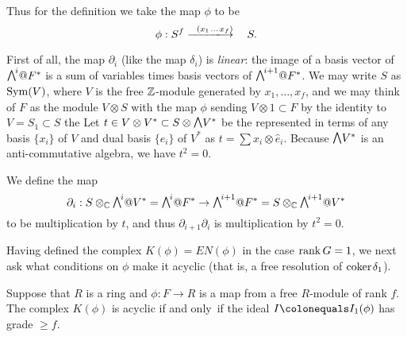 Thus for the definition we take the map $\phi$ to be
$$
\phi: S^{f}\ruuuto {\ \
(x_{1} \,\dots \, x_{f})
} \hskip0.7em S.
$$

First of all, the map $\partial_{i}$ (like the map $\delta_{i}$) is
\emph{linear}: the image of a basis vector of $\mwedge^{i}@F^{*} $ is a
sum of variables times basis vectors
of $\mwedge^{i+1}@F^{*}$. We may write $S$ as $\operatorname{Sym}(V)$, where $V$ is the
free ${\mathbb Z}$-module generated by $x_{1}, \dots, x_{f}$, and we may think
of $F$ as the module $V\otimes S$ with the map
$\phi$ sending $V\otimes 1\subset F$ by the identity to $V = S_{1}\subset S$
\emdash the 
%
Let $t\in V\otimes V^{*}\subset S\otimes \mwedge \,V^{*}$ be the 
\index{trace}%
represented in terms of any basis $\{x_{i}\}$ of $V$
and dual basis $\{\hat e_{i}\}$ of $V^{*}$ as $t = \sum x_{i}\otimes
\hat e_{i}$. Because $\mwedge \,V^{*}$ is
an anti-commutative algebra, we have $t^{2} = 0$.

We define the map
$$
\partial_{i}: S\otimes_{\CC} \mwedge^{i}@V^{*} = \mwedge^{i}@F^{*}  \to
\mwedge^{i+1}@F^{*} = S\otimes_{\CC} \mwedge^{i+1}@V^{*}
$$
to be multiplication by $t$, and thus $\partial_{i+1}\partial_{i}$ is
multiplication by $t^{2} = 0$.

Having defined the complex $K(\phi) = EN(\phi)$ in the case $\operatorname{rank} G =
1$, we next ask what conditions on $\phi$
make it acyclic (that is, a free resolution of ${\rm{coker}\kern1pt} \delta_{1}$).

\begin{theorem}\label{rankG1}
Suppose that $R$ is a ring and $\phi: F\to R$ is a map from a free
$R$-module of rank $f$.
The complex $K(\phi)$ is acyclic if and only~if the ideal $I \colonequals
I_{1}(\phi)$ has grade $\geq f$.
%
\end{theorem}

